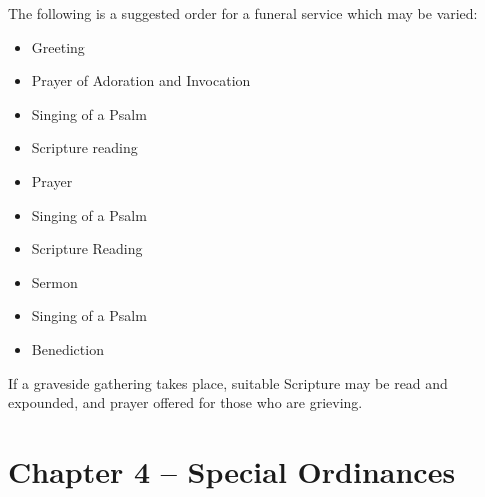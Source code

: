 \begin{outerlst}[left=0pt,labelsep=0pt]
\begin{innerlst}[resume*]
      \item The following is a suggested order for a funeral service which may be varied: 
      \begin{itemize}[noitemsep]
            \item Greeting 
            \item Prayer of Adoration and Invocation 
            \item Singing of a Psalm 
            \item Scripture reading  
            \item Prayer 
            \item Singing of a Psalm 
            \item Scripture Reading 
            \item Sermon 
            \item Singing of a Psalm 
            \item Benediction 
      \end{itemize} 
      \item If a graveside gathering takes place, suitable Scripture may be read and expounded, and prayer offered for those who are grieving. 
\end{innerlst} 

\item
{}
\section{Chapter 4 -- Special Ordinances}  


\end{outerlst}
